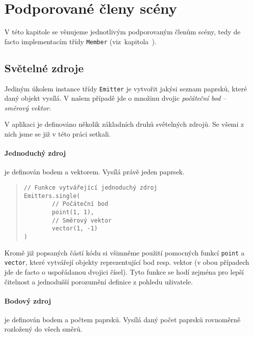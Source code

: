 \section{Podporované členy scény}
\label{sec:podporovaneoptickeprvky}

V této kapitole se věnujeme jednotlivým podporovaným členům scény, tedy de facto implementacím třídy \texttt{Member} (viz~kapitola~).

\subsection{Světelné zdroje}

Jediným úkolem instance třídy \texttt{Emitter} je vytvořit jakýsi seznam paprsků, které daný objekt vysílá. V našem případě jde o množinu dvojic \emph{počáteční bod} -- \emph{směrový vektor}.

V aplikaci je definováno několik základních druhů světelných zdrojů. Se všemi z nich jsme se již v této práci setkali.

\paragraph{Jednoduchý zdroj} je definován bodem a vektorem. Vysílá právě jeden paprsek.

\begin{minipage}{\textwidth}\begin{quote}\begin{lstlisting}
// Funkce vytvářející jednoduchý zdroj
Emitters.single(
        // Počáteční bod
        point(1, 1),
        // Směrový vektor
        vector(1, -1)
)
\end{lstlisting}\end{quote}\end{minipage}


Kromě již popsaných částí kódu si všimněme použití pomocných funkcí \texttt{point} a \texttt{vector}, které vytvářejí objekty reprezentující bod resp. vektor (v obou případech jde de facto o uspořádanou dvojici čísel). Tyto funkce se hodí zejména pro lepší čitelnost a jednodušší porozumění definice z pohledu uživatele.

\paragraph{Bodový zdroj} je definován bodem a počtem paprsků. Vysílá daný počet paprsků rovnoměrně rozložený do všech směrů.

